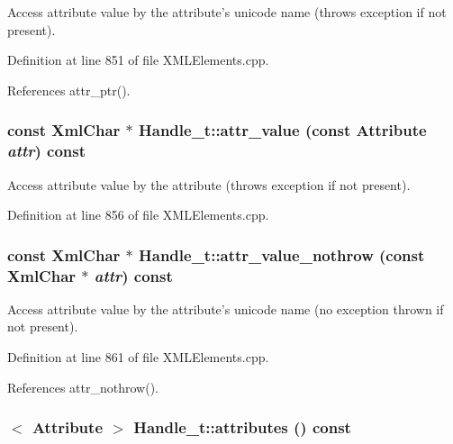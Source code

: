 Access attribute value by the attribute's unicode name (throws exception if not present). 

Definition at line 851 of file XMLElements.cpp.

References attr\_\-ptr().\hypertarget{class_d_d4hep_1_1_x_m_l_1_1_handle__t_a6a361bb14e86de168935c9614a261a12}{
\subsubsection[{attr\_\-value}]{\setlength{\rightskip}{0pt plus 5cm}const {\bf XmlChar} $\ast$ Handle\_\-t::attr\_\-value (const {\bf Attribute} {\em attr}) const}}
\label{class_d_d4hep_1_1_x_m_l_1_1_handle__t_a6a361bb14e86de168935c9614a261a12}


Access attribute value by the attribute (throws exception if not present). 

Definition at line 856 of file XMLElements.cpp.\hypertarget{class_d_d4hep_1_1_x_m_l_1_1_handle__t_aa66d7cdd06c05c382eb9597eb4e06db2}{
\subsubsection[{attr\_\-value\_\-nothrow}]{\setlength{\rightskip}{0pt plus 5cm}const {\bf XmlChar} $\ast$ Handle\_\-t::attr\_\-value\_\-nothrow (const {\bf XmlChar} $\ast$ {\em attr}) const}}
\label{class_d_d4hep_1_1_x_m_l_1_1_handle__t_aa66d7cdd06c05c382eb9597eb4e06db2}


Access attribute value by the attribute's unicode name (no exception thrown if not present). 

Definition at line 861 of file XMLElements.cpp.

References attr\_\-nothrow().\hypertarget{class_d_d4hep_1_1_x_m_l_1_1_handle__t_a85784c7411cdcf10e5601b1147dfdf46}{
\subsubsection[{attributes}]{$<$ {\bf Attribute} $>$ Handle\_\-t::attributes () const}}
\label{class_d_d4hep_1_1_x_m_l_1_1_handle__t_a85784c7411cdcf10e5601b1147dfdf46}



